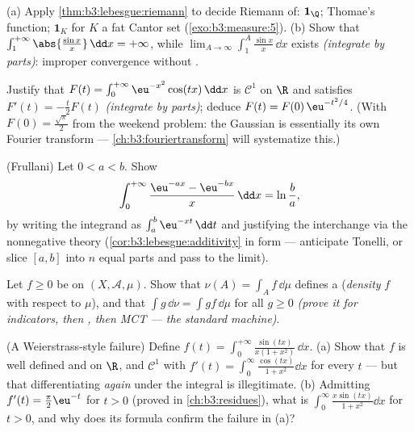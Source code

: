 \begin{exercise}[$\star\star$]\label{exo:b3:lebesgue:6}
(a) Apply \cref{thm:b3:lebesgue:riemann} to decide Riemann
 of: $\mathbf 1_\Q$; Thomae's function; $\mathbf
1_K$ for $K$ a fat Cantor set (\cref{exo:b3:measure:5}).
(b) Show that $\int_1^{+\infty}\abs{\frac{\sin x}x}\,\dd x =
+\infty$, while $\lim_{A\to\infty}\int_1^A\frac{\sin
x}x\,\dd x$ exists \emph{(integrate by parts)}: improper
convergence without .
\end{exercise}

\begin{exercise}[$\star\star$]\label{exo:b3:lebesgue:7}
Justify that $F(t) = \int_0^{+\infty}\eu^{-x^2}\cos(tx)\,\dd x$
is $\mathcal C^1$ on $\R$ and satisfies $F'(t) = -\frac t2F(t)$
\emph{(integrate by parts)}; deduce $F(t) =
F(0)\,\eu^{-t^2/4}$. (With $F(0) = \frac{\sqrt\pi}2$ from the
weekend problem: the Gaussian is essentially its own Fourier
transform --- \cref{ch:b3:fouriertransform} will systematize
this.)
\end{exercise}

\begin{exercise}[$\star\star\star$]\label{exo:b3:lebesgue:8}
(Frullani) Let $0 < a < b$. Show
\[
\int_0^{+\infty}\frac{\eu^{-ax} - \eu^{-bx}}{x}\,\dd x =
\ln\frac ba,
\]
by writing the integrand as $\int_a^b \eu^{-xt}\,\dd t$ and
justifying the interchange via the nonnegative theory
(\cref{cor:b3:lebesgue:additivity} in  form ---
anticipate Tonelli, or slice $[a,b]$ into $n$ equal parts and
pass to the limit).
\end{exercise}

\begin{exercise}[$\star\star$]\label{exo:b3:lebesgue:9}
Let $f \geq 0$ be  on $(X, \mathcal A, \mu)$. Show
that $\nu(A) = \int_A f\,\dd\mu$ defines a 
(\emph{density} $f$ with respect to
$\mu$), and that $\int g\,\dd\nu = \int gf\,\dd\mu$ for all
 $g \geq 0$ \emph{(prove it for indicators, then
, then MCT --- the standard machine)}.
\end{exercise}

\begin{exercise}[$\star\star\star$]\label{exo:b3:lebesgue:10}
(A Weierstrass-style failure) Define $f(t) =
\int_0^{+\infty}\frac{\sin(tx)}{x(1 + x^2)}\,\dd x$.
(a) Show that $f$ is well defined and  on $\R$, and
$\mathcal C^1$ with $f'(t) = \int_0^\infty\frac{\cos(tx)}{1 +
x^2}\dd x$ for every $t$ --- but that differentiating
\emph{again} under the integral is illegitimate.
(b) Admitting $f'(t) = \frac\pi2\eu^{-t}$ for $t > 0$ (proved
in \cref{ch:b3:residues}), what is
$\int_0^\infty\frac{x\sin(tx)}{1+x^2}\dd x$ for $t > 0$, and
why does its formula confirm the failure in (a)?
\end{exercise}

